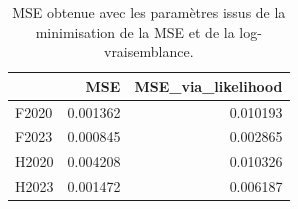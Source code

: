\begin{table}[htbp]
\caption{MSE obtenue avec les paramètres issus de la minimisation de la MSE et de la log-vraisemblance.}
\label{tab:comp_mse}
\begin{tabular}{lrr}
\toprule
 & MSE & MSE\_via\_likelihood \\
\midrule
F2020 & 0.001362 & 0.010193 \\
F2023 & 0.000845 & 0.002865 \\
H2020 & 0.004208 & 0.010326 \\
H2023 & 0.001472 & 0.006187 \\
\bottomrule
\end{tabular}
\end{table}
